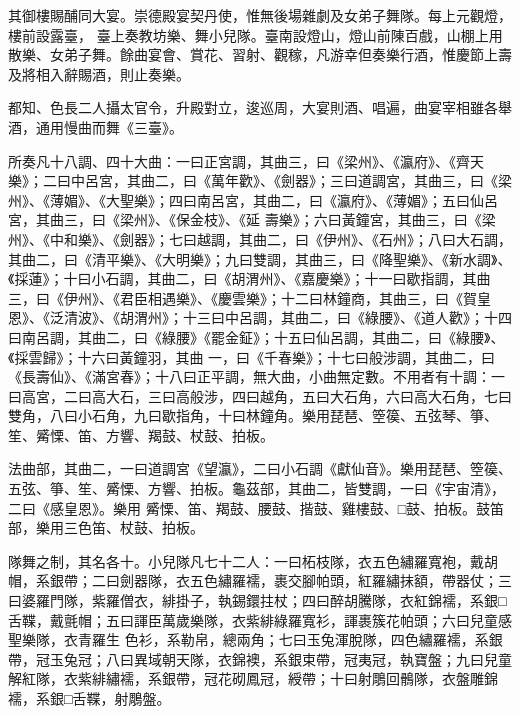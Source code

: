 \begin{pinyinscope}
 其御樓賜酺同大宴。崇德殿宴契丹使，惟無後場雜劇及女弟子舞隊。每上元觀燈，樓前設露臺，
 臺上奏教坊樂、舞小兒隊。臺南設燈山，燈山前陳百戲，山棚上用散樂、女弟子舞。餘曲宴會、賞花、習射、觀稼，凡游幸但奏樂行酒，惟慶節上壽及將相入辭賜酒，則止奏樂。



 都知、色長二人攝太官令，升殿對立，逡巡周，大宴則酒、唱遍，曲宴宰相雖各舉酒，通用慢曲而舞《三臺》。



 所奏凡十八調、四十大曲：一曰正宮調，其曲三，曰《梁州》、《瀛府》、《齊天樂》；二曰中呂宮，其曲二，曰《萬年歡》、《劍器》；三曰道調宮，其曲三，曰《梁州》、《薄媚》、《大聖樂》；四曰南呂宮，其曲二，曰《瀛府》、《薄媚》；五曰仙呂宮，其曲三，曰《梁州》、《保金枝》、《延
 壽樂》；六曰黃鐘宮，其曲三，曰《梁州》、《中和樂》、《劍器》；七曰越調，其曲二，曰《伊州》、《石州》；八曰大石調，其曲二，曰《清平樂》、《大明樂》；九曰雙調，其曲三，曰《降聖樂》、《新水調》、《採蓮》；十曰小石調，其曲二，曰《胡渭州》、《嘉慶樂》；十一曰歇指調，其曲三，曰《伊州》、《君臣相遇樂》、《慶雲樂》；十二曰林鐘商，其曲三，曰《賀皇恩》、《泛清波》、《胡渭州》；十三曰中呂調，其曲二，曰《綠腰》、《道人歡》；十四曰南呂調，其曲二，曰《綠腰》《罷金鉦》；十五曰仙呂調，其曲二，曰《綠腰》、《採雲歸》；十六曰黃鐘羽，其曲
 一，曰《千春樂》；十七曰般涉調，其曲二，曰《長壽仙》、《滿宮春》；十八曰正平調，無大曲，小曲無定數。不用者有十調：一曰高宮，二曰高大石，三曰高般涉，四曰越角，五曰大石角，六曰高大石角，七曰雙角，八曰小石角，九曰歇指角，十曰林鐘角。樂用琵琶、箜篌、五弦琴、箏、笙、觱慄、笛、方響、羯鼓、杖鼓、拍板。



 法曲部，其曲二，一曰道調宮《望瀛》，二曰小石調《獻仙音》。樂用琵琶、箜篌、五弦、箏、笙、觱慄、方響、拍板。龜茲部，其曲二，皆雙調，一曰《宇宙清》，二曰《感皇恩》。樂用
 觱慄、笛、羯鼓、腰鼓、揩鼓、雞樓鼓、□鼓、拍板。鼓笛部，樂用三色笛、杖鼓、拍板。



 隊舞之制，其名各十。小兒隊凡七十二人：一曰柘枝隊，衣五色繡羅寬袍，戴胡帽，系銀帶；二曰劍器隊，衣五色繡羅襦，裹交腳帕頭，紅羅繡抹額，帶器仗；三曰婆羅門隊，紫羅僧衣，緋掛子，執錫鐶拄杖；四曰醉胡騰隊，衣紅錦襦，系銀□舌鞢，戴氈帽；五曰諢臣萬歲樂隊，衣紫緋綠羅寬衫，諢裹簇花帕頭；六曰兒童感聖樂隊，衣青羅生
 色衫，系勒帛，總兩角；七曰玉兔渾脫隊，四色繡羅襦，系銀帶，冠玉兔冠；八曰異域朝天隊，衣錦襖，系銀束帶，冠夷冠，執寶盤；九曰兒童解紅隊，衣紫緋繡襦，系銀帶，冠花砌鳳冠，綬帶；十曰射鵰回鶻隊，衣盤雕錦襦，系銀□舌鞢，射鵰盤。




\end{pinyinscope}
